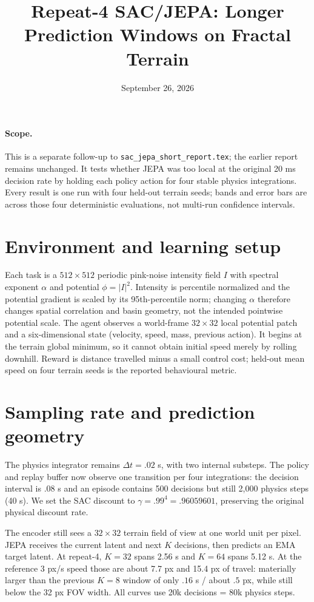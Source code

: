 \documentclass[10pt]{article}
\title{Repeat-4 SAC/JEPA: Longer Prediction Windows on Fractal Terrain}
\author{}
\date{September 26, 2026}
\begin{document}
\maketitle

\paragraph{Scope.} This is a separate follow-up to \texttt{sac\_jepa\_short\_report.tex}; the earlier report remains unchanged. It tests whether JEPA was too local at the original 20 ms decision rate by holding each policy action for four stable physics integrations. Every result is one run with four held-out terrain seeds; bands and error bars are across those four deterministic evaluations, not multi-run confidence intervals.

\section{Environment and learning setup}
Each task is a $512\times512$ periodic pink-noise intensity field $I$ with
spectral exponent $\alpha$ and potential $\phi=|I|^2$. Intensity is percentile
normalized and the potential gradient is scaled by its 95th-percentile norm;
changing $\alpha$ therefore changes spatial correlation and basin geometry,
not the intended pointwise potential scale. The agent observes a world-frame
$32\times32$ local potential patch and a six-dimensional state (velocity,
speed, mass, previous action). It begins at the terrain global minimum, so it
cannot obtain initial speed merely by rolling downhill. Reward is distance
travelled minus a small control cost; held-out mean speed on four terrain seeds
is the reported behavioural metric.

\section{Sampling rate and prediction geometry}
The physics integrator remains $\Delta t=.02$ s, with two internal substeps. The policy and replay buffer now observe one transition per four integrations: the decision interval is $.08$ s and an episode contains 500 decisions but still 2,000 physics steps (40 s). We set the SAC discount to $\gamma=.99^4=.96059601$, preserving the original physical discount rate.

The encoder still sees a $32\times32$ terrain field of view at one world unit per pixel. JEPA receives the current latent and next $K$ decisions, then predicts an EMA target latent. At repeat-4, $K=32$ spans 2.56 s and $K=64$ spans 5.12 s. At the reference 3 px/s speed those are about 7.7 px and 15.4 px of travel: materially larger than the previous $K=8$ window of only $.16$ s / about $.5$ px, while still below the 32 px FOV width. All curves use 20k decisions = 80k physics steps.
\end{document}
